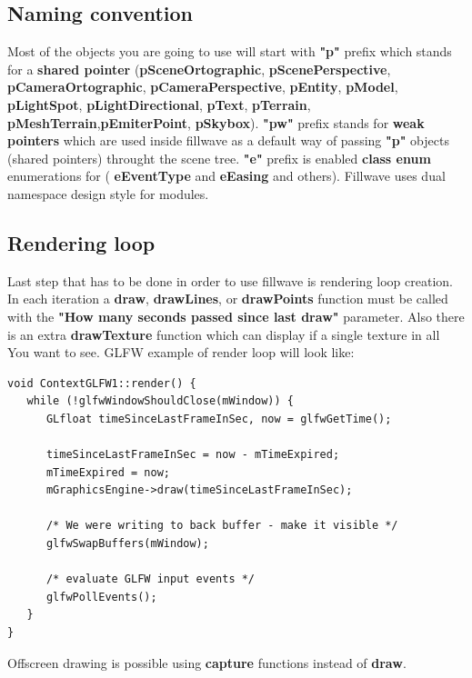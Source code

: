 \documentclass{article}
\begin{document}
\subsection{Naming convention}\label{sec:Naming convention}
\indent \indent Most of the objects you are going to use will start with \textbf{"p"} prefix which stands for a \textbf{shared pointer} (\textbf{pSceneOrtographic}, \textbf{pScenePerspective}, \textbf{pCameraOrtographic}, \textbf{pCameraPerspective}, \textbf{pEntity}, \textbf{pModel}, \textbf{pLightSpot}, \textbf{pLightDirectional}, \textbf{pText}, \textbf{pTerrain}, \textbf{pMeshTerrain},\textbf{pEmiterPoint}, \textbf{pSkybox}). \textbf{"pw"} prefix stands for \textbf{weak pointers} which are used inside fillwave as a default way of passing \textbf{"p"} objects (shared pointers) throught the scene tree.  \textbf{"e"} prefix is enabled \textbf{class enum} enumerations for ( \textbf{eEventType} and \textbf{eEasing} and others). Fillwave uses dual namespace design style for modules.

\subsection{Rendering loop}\label{sec:Loop}

\indent \indent Last step that has to be done in order to use fillwave is rendering loop creation. In each iteration a \textbf{draw}, \textbf{drawLines}, or \textbf{drawPoints} function must be called with the \textbf{"How many seconds passed since last draw"} parameter. Also there is an extra \textbf{drawTexture} function which can display if a single texture in all You want to see. GLFW example of render loop will look like:

\begin{lstlisting}
void ContextGLFW1::render() {
   while (!glfwWindowShouldClose(mWindow)) {
      GLfloat timeSinceLastFrameInSec, now = glfwGetTime();

      timeSinceLastFrameInSec = now - mTimeExpired;
      mTimeExpired = now;
      mGraphicsEngine->draw(timeSinceLastFrameInSec);

      /* We were writing to back buffer - make it visible */
      glfwSwapBuffers(mWindow);
      
      /* evaluate GLFW input events */
      glfwPollEvents();
   }
}
\end{lstlisting}

\indent Offscreen drawing is possible using \textbf{capture} functions instead of \textbf{draw}.
\end{document}
